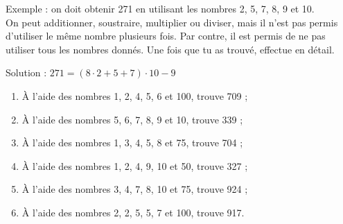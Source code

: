 \begin{exercice}
Exemple : on doit obtenir 271 en utilisant les nombres 2, 5, 7, 8, 9 et 10. \\[0.75em]
On peut additionner, soustraire, multiplier ou diviser, mais il n’est pas permis d’utiliser le même nombre plusieurs fois. Par contre, il est permis de ne pas utiliser tous les nombres donnés. Une fois que tu as trouvé, effectue en détail.
\begin{center} Solution : $271 = (8 \cdot 2 + 5 + 7) \cdot 10 - 9$ \end{center}
\begin{enumerate}
 \item À l'aide des nombres 1, 2, 4, 5, 6 et 100, trouve 709 ;
 \item À l'aide des nombres 5, 6, 7, 8, 9 et 10, trouve 339 ;
 \item À l'aide des nombres 1, 3, 4, 5, 8 et 75, trouve 704 ;
 \item À l'aide des nombres 1, 2, 4, 9, 10 et 50, trouve 327 ;
 \item À l'aide des nombres 3, 4, 7, 8, 10 et 75, trouve 924 ;
 \item À l'aide des nombres 2, 2, 5, 5, 7 et 100, trouve 917.
 \end{enumerate}
\end{exercice}